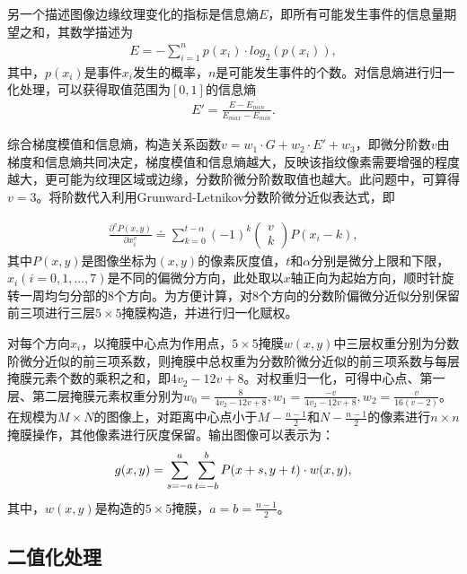 \documentclass{whutmod}
\begin{document}
另一个描述图像边缘纹理变化的指标是信息熵$E$，即所有可能发生事件的信息量期望之和，其数学描述为
\begin{gather}
	E=-\sum_{i=1}^{n}p(x_i)\cdot log_2(p(x_i)),	
\end{gather}
其中，$p(x_i)$是事件$x_i$发生的概率，$n$是可能发生事件的个数。对信息熵进行归一化处理，可以获得取值范围为$[0,1]$的信息熵
\begin{gather}
	\displaystyle E'=\frac{E-E_{min}}{E_{max}-E_{min}}.
\end{gather}

综合梯度模值和信息熵，构造关系函数$v=w_1\cdot G+w_2\cdot E'+w_3$，即微分阶数$v$由梯度和信息熵共同决定，梯度模值和信息熵越大，反映该指纹像素需要增强的程度越大，更可能为纹理区域或边缘，分数阶微分阶数取值也越大。此问题中，可算得$v=3$。将阶数代入利用Grunward-Letnikov分数阶微分近似表达式，即

\begin{gather}
	\displaystyle\frac{\partial^v P(x,y)}{\partial x_{i}^{v}}\doteq\displaystyle\sum_{k=0}^{t-\alpha}(-1)^{k}\begin{pmatrix}
		v \\ k
	\end{pmatrix}P(x_i-k), 
\end{gather}
其中$P(x,y)$是图像坐标为$(x,y)$的像素灰度值，$t$和$\alpha$分别是微分上限和下限，$x_i(i=0,1,...,7)$是不同的偏微分方向，此处取以$x$轴正向为起始方向，顺时针旋转一周均匀分部的$8$个方向。为方便计算，对$8$个方向的分数阶偏微分近似分别保留前三项进行三层$5 \times 5$掩膜构造，并进行归一化赋权。

对每个方向$x_i$，以掩膜中心点为作用点，$5\times 5$掩膜$w(x,y)$中三层权重分别为分数阶微分近似的前三项系数，则掩膜中总权重为分数阶微分近似的前三项系数与每层掩膜元素个数的乘积之和，即$4v_2-12v+8$。对权重归一化，可得中心点、第一层、第二层掩膜元素权重分别为$\displaystyle w_0=\frac{8}{4v_2-12v+8}, w_1=\frac{-v}{4v_2-12v+8}, w_2=\frac{v}{16(v-2)}$。
在规模为$M\times N$的图像上，对距离中心点小于$\displaystyle M-\frac{n-1}{2}$和$\displaystyle N-\frac{n-1}{2}$的像素进行$n\times n$掩膜操作，其他像素进行灰度保留。输出图像可以表示为：
\begin{gather}
	\displaystyle g(x,y)=\sum_{s=-a}^{a}\sum_{t=-b}^{b}P(x+s,y+t)\cdot \boldmath{w}(x,y),
\end{gather}
其中，$w(x,y)$是构造的$5\times 5$掩膜，$a=b=\displaystyle \frac{n-1}{2}$。


\subsection{二值化处理}	  	
\end{document}
